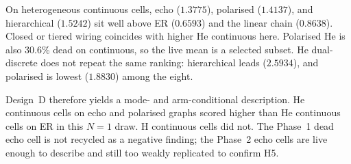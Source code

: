 On heterogeneous continuous cells, echo ($1.3775$), polarised ($1.4137$), and hierarchical ($1.5242$) sit well above ER ($0.6593$) and the linear chain ($0.8638$).
Closed or tiered wiring coincides with higher He continuous \MPR{} here.
Polarised He is also 30.6\% dead on continuous, so the live mean is a selected subset.
He dual-discrete does not repeat the same ranking: hierarchical leads ($2.5934$), and polarised is lowest ($1.8830$) among the eight.

Design~D therefore yields a mode- and arm-conditional description.
He continuous cells on echo and polarised graphs scored higher than He continuous cells on ER in this $N=1$ draw.
H continuous cells did not.
The Phase~1 dead echo cell is not recycled as a negative finding; the Phase~2 echo cells are live enough to describe and still too weakly replicated to confirm H5.
